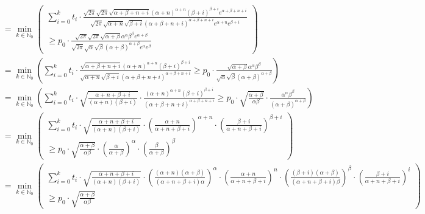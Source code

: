 \documentclass[10pt,a4paper]{article}
\begin{document}
\begin{align*}
                      & = \min_{k \in \mathbb{N}_{0}} \left( \begin{array}{r} \sum_{i = 0}^{k} t_{i} \cdot \frac{\sqrt{2\pi} \sqrt{2\pi} \sqrt{\alpha + \beta + n + i} (\alpha + n)^{\alpha + n} (\beta + i)^{\beta + i} e^{\alpha + \beta + n + i}}{\sqrt{2\pi} \sqrt{\alpha + n} \sqrt{\beta + i} (\alpha + \beta + n + i)^{\alpha + \beta + n + i} e^{\alpha + n} e^{\beta + i}}\\ \ge p_{0} \cdot \frac{\sqrt{2\pi} \sqrt{2\pi} \sqrt{\alpha + \beta} \alpha^{\alpha} \beta^{\beta} e^{\alpha + \beta}}{\sqrt{2\pi} \sqrt{\alpha} \sqrt{\beta} (\alpha + \beta)^{\alpha + \beta} e^{\alpha} e^{\beta}} \end{array} \right)\\
                      & = \min_{k \in \mathbb{N}_{0}} \left( \sum_{i = 0}^{k} t_{i} \cdot \frac{\sqrt{\alpha + \beta + n + i} (\alpha + n)^{\alpha + n} (\beta + i)^{\beta + i}}{\sqrt{\alpha + n} \sqrt{\beta + i} (\alpha + \beta + n + i)^{\alpha + \beta + n + i}} \ge p_{0} \cdot \frac{\sqrt{\alpha + \beta} \alpha^{\alpha} \beta^{\beta}}{\sqrt{\alpha} \sqrt{\beta} (\alpha + \beta)^{\alpha + \beta}} \right)\\
                      & = \min_{k \in \mathbb{N}_{0}} \left( \sum_{i = 0}^{k} t_{i} \cdot \sqrt{\frac{\alpha + n + \beta + i}{(\alpha + n)(\beta + i)}} \cdot \frac{(\alpha + n)^{\alpha + n} (\beta + i)^{\beta + i}}{(\alpha + \beta + n + i)^{\alpha + \beta + n + i}} \ge p_{0} \cdot \sqrt{\frac{\alpha + \beta}{\alpha\beta}} \cdot \frac{\alpha^{\alpha} \beta^{\beta}}{(\alpha + \beta)^{\alpha + \beta}} \right)\\
                      & = \min_{k \in \mathbb{N}_{0}} \left( \begin{array}{r} \sum_{i = 0}^{k} t_{i} \cdot \sqrt{\frac{\alpha + n + \beta + i}{(\alpha + n)(\beta + i)}} \cdot \left( \frac{\alpha + n}{\alpha + n + \beta + i} \right)^{\alpha + n} \cdot \left( \frac{\beta + i}{\alpha + n + \beta + i} \right)^{\beta + i}\\ \ge p_{0} \cdot \sqrt{\frac{\alpha + \beta}{\alpha\beta}} \cdot \left( \frac{\alpha}{\alpha + \beta} \right)^{\alpha} \cdot \left( \frac{\beta}{\alpha + \beta} \right)^{\beta} \end{array} \right)\\
                      & = \min_{k \in \mathbb{N}_{0}} \left( \begin{array}{r} \sum_{i = 0}^{k} t_{i} \cdot \sqrt{\frac{\alpha + n + \beta + i}{(\alpha + n)(\beta + i)}} \cdot \left( \frac{(\alpha + n)(\alpha + \beta)}{(\alpha + n + \beta + i)\alpha} \right)^{\alpha} \cdot \left( \frac{\alpha + n}{\alpha + n + \beta + i} \right)^{n} \cdot \left( \frac{(\beta + i)(\alpha + \beta)}{(\alpha + n + \beta + i)\beta} \right)^{\beta} \cdot \left( \frac{\beta + i}{\alpha + n + \beta + i} \right)^{i}\\ \ge p_{0} \cdot \sqrt{\frac{\alpha + \beta}{\alpha\beta}} \end{array} \right)\\

\end{align*}
\end{document}
